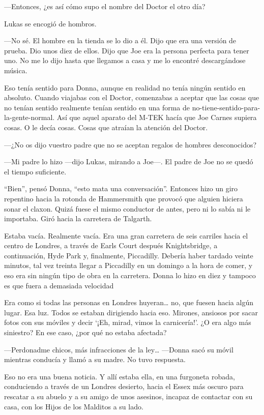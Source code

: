 ---Entonces, ¿es así cómo supo el nombre del Doctor el otro día?

Lukas se encogió de hombros.

---No sé. El hombre en la tienda se lo dio a él. Dijo que era una
versión de prueba. Dio unos diez de ellos. Dijo que Joe era la persona
perfecta para tener uno. No me lo dijo hasta que llegamos a casa y me lo
encontré descargándose música.

Eso tenía sentido para Donna, aunque en realidad no tenía ningún sentido
en absoluto. Cuando viajabas con el Doctor, comenzabas a aceptar que las
cosas que no tenían sentido realmente tenían sentido en una forma de
no-tiene-sentido-para-la-gente-normal. Así que aquel aparato del M-TEK
hacía que Joe Carnes supiera cosas. O le decía cosas. Cosas que atraían
la atención del Doctor.

---¿No os dijo vuestro padre que no se aceptan regalos de hombres
desconocidos?

---Mi padre lo hizo ---dijo Lukas, mirando a Joe---. El padre de Joe no
se quedó el tiempo suficiente.

``Bien'', pensó Donna, ``esto mata una conversación''. Entonces hizo un
giro repentino hacia la rotonda de Hammersmith que provocó que alguien
hiciera sonar el claxon. Quizá fuese el mismo conductor de antes, pero
ni lo sabía ni le importaba. Giró hacia la carretera de Talgarth.

Estaba vacía. Realmente vacía. Era una gran carretera de seis carriles
hacia el centro de Londres, a través de Earls Court después
Knightsbridge, a continuación, Hyde Park y, finalmente, Piccadilly.
Debería haber tardado veinte minutos, tal vez treinta llegar a
Piccadilly en un domingo a la hora de comer, y eso era sin ningún tipo
de obra en la carretera. Donna lo hizo en diez y tampoco es que fuera a
demasiada velocidad

Era como si todas las personas en Londres huyeran\ldots{} no, que fuesen
hacia algún lugar. Esa luz. Todos se estaban dirigiendo hacia eso.
Mirones, ansiosos por sacar fotos con sus móviles y decir `¡Eh, mirad,
vimos la carnicería!'. ¿O era algo más siniestro? En ese caso, ¿por qué
no estaba afectada?

---Perdonadme chicos, más infracciones de la ley\ldots{} ---Donna sacó
su móvil mientras conducía y llamó a su madre. No tuvo respuesta.

Eso no era una buena noticia. Y allí estaba ella, en una furgoneta
robada, conduciendo a través de un Londres desierto, hacia el Essex más
oscuro para rescatar a su abuelo y a su amigo de unos asesinos, incapaz
de contactar con su casa, con los Hijos de los Malditos a su lado.

